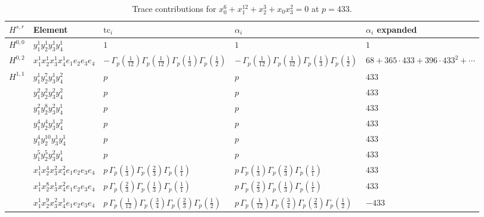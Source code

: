 \documentclass[11pt]{article}
\begin{document}
\begin{table}[ht]
\centering
\caption{Trace contributions for $x_0^{6} + x_1^{12} + x_2^{3} + x_0 x_3^{2} = 0$ at $p=433$.}\label{tab:deformed-28}
\renewcommand{\arraystretch}{1.1}
{\scriptsize
\begin{tabular}{@{}lllll@{}}
\toprule
$H^{s,r}$ & Element & $\mathrm{tc}_i$ & $\alpha_i$ & $\alpha_i$ expanded \\
\midrule
$H^{0,0}$ & $y_{1}^{1} y_{2}^{1} y_{3}^{1} y_{4}^{1}$ & $1$ & $1$ & $1$ \\
\midrule
$H^{0,2}$ & $x_{1}^{1} x_{2}^{1} x_{3}^{1} x_{4}^{1}  e_{1} e_{2} e_{3} e_{4}$ & $- \, \Gamma_p \left( \frac{1}{12} \right) \Gamma_p \left( \frac{1}{12} \right) \Gamma_p \left( \frac{1}{3} \right) \Gamma_p \left( \frac{1}{2} \right)$ & $- \, \Gamma_p \left( \frac{1}{12} \right) \Gamma_p \left( \frac{1}{12} \right) \Gamma_p \left( \frac{1}{3} \right) \Gamma_p \left( \frac{1}{2} \right)$ & $68{+}365{\cdot}433{+}396{\cdot}433^{2}{+}\cdots$ \\
\midrule
$H^{1,1}$ & $y_{1}^{1} y_{2}^{7} y_{3}^{1} y_{4}^{2}$ & $p \,$ & $p \,$ & $433$ \\
 & $y_{1}^{2} y_{2}^{2} y_{3}^{2} y_{4}^{2}$ & $p \,$ & $p \,$ & $433$ \\
 & $y_{1}^{2} y_{2}^{8} y_{3}^{2} y_{4}^{1}$ & $p \,$ & $p \,$ & $433$ \\
 & $y_{1}^{4} y_{2}^{4} y_{3}^{1} y_{4}^{2}$ & $p \,$ & $p \,$ & $433$ \\
 & $y_{1}^{4} y_{2}^{10} y_{3}^{1} y_{4}^{1}$ & $p \,$ & $p \,$ & $433$ \\
 & $y_{1}^{5} y_{2}^{5} y_{3}^{2} y_{4}^{1}$ & $p \,$ & $p \,$ & $433$ \\
 & $x_{1}^{1} x_{2}^{4} x_{3}^{2} x_{4}^{2}  e_{1} e_{2} e_{3} e_{4}$ & $p \, \Gamma_p \left( \frac{1}{3} \right) \Gamma_p \left( \frac{2}{3} \right) \Gamma_p \left( \frac{1}{1} \right)$ & $p \, \Gamma_p \left( \frac{1}{3} \right) \Gamma_p \left( \frac{2}{3} \right) \Gamma_p \left( \frac{1}{1} \right)$ & $433$ \\
 & $x_{1}^{1} x_{2}^{8} x_{3}^{1} x_{4}^{2}  e_{1} e_{2} e_{3} e_{4}$ & $p \, \Gamma_p \left( \frac{2}{3} \right) \Gamma_p \left( \frac{1}{3} \right) \Gamma_p \left( \frac{1}{1} \right)$ & $p \, \Gamma_p \left( \frac{2}{3} \right) \Gamma_p \left( \frac{1}{3} \right) \Gamma_p \left( \frac{1}{1} \right)$ & $433$ \\
 & $x_{1}^{1} x_{2}^{9} x_{3}^{2} x_{4}^{1}  e_{1} e_{2} e_{3} e_{4}$ & $p \, \Gamma_p \left( \frac{1}{12} \right) \Gamma_p \left( \frac{3}{4} \right) \Gamma_p \left( \frac{2}{3} \right) \Gamma_p \left( \frac{1}{2} \right)$ & $p \, \Gamma_p \left( \frac{1}{12} \right) \Gamma_p \left( \frac{3}{4} \right) \Gamma_p \left( \frac{2}{3} \right) \Gamma_p \left( \frac{1}{2} \right)$ & $-433$ \\

\end{tabular}}
\end{table}
\end{document}
